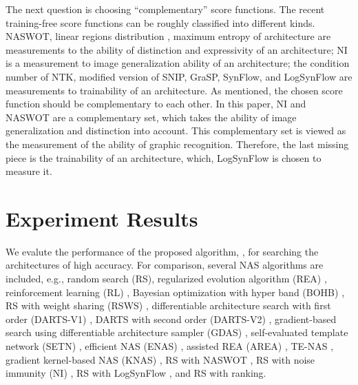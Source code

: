 \documentclass[sigconf]{acmart}
\begin{document}
    The next question is %
    choosing ``complementary'' score functions. The recent training-free 
    score functions can be roughly classified into different kinds. NASWOT, 
    linear regions distribution \cite{https://doi.org/10.48550/arxiv.2102.11535} \cite{lin2021zennas}, 
    maximum entropy of architecture \cite{sun2022maedet} are measurements 
    to the ability of distinction and expressivity of an architecture; 
    NI is a measurement to image generalization ability of an architecture; 
    the condition number of NTK, modified version of SNIP, GraSP, SynFlow, and 
    LogSynFlow are measurements to trainability of an architecture. 
    As mentioned, the chosen score function should be complementary to each other. 
    In this paper, NI and NASWOT are a complementary set, which takes 
    the ability of image generalization and distinction into account. 
    This complementary set is viewed as the measurement of the ability of graphic 
    recognition. Therefore, the last missing piece is the trainability of an 
    architecture, which, LogSynFlow is chosen to measure it. 

    \section{Experiment Results}
    \label{sec:results}

    We evalute the performance of the proposed algorithm, \palg{}, 
    for searching the architectures of high accuracy. For comparison, several NAS 
    algorithms are included, e.g., random search (RS), regularized evolution algorithm 
    (REA) \cite{real2019regularized}, reinforcement learning (RL) \cite{Williams:92}, 
    Bayesian optimization with hyper band (BOHB) \cite{falkner2018bohb}, RS with 
    weight sharing (RSWS) \cite{li2019random}, differentiable architecture search 
    with first order (DARTS-V1) \cite{liu2019darts}, DARTS with second order 
    (DARTS-V2) \cite{liu2019darts}, gradient-based search using differentiable 
    architecture sampler (GDAS) \cite{dong2019searching}, self-evaluated template 
    network (SETN) \cite{Dong_2019}, efficient NAS (ENAS) \cite{pham2018efficient}, 
    assisted REA (AREA) \cite{https://doi.org/10.48550/arxiv.2006.04647}, 
    TE-NAS \cite{https://doi.org/10.48550/arxiv.2102.11535}, gradient kernel-based 
    NAS (KNAS) \cite{xu2021knas}, RS with NASWOT \cite{https://doi.org/10.48550/arxiv.2006.04647}, 
    RS with noise immunity (NI) \cite{10092788}, RS with LogSynFlow \cite{Cavagnero_2023}, 
    and RS with ranking.  
\end{document}
